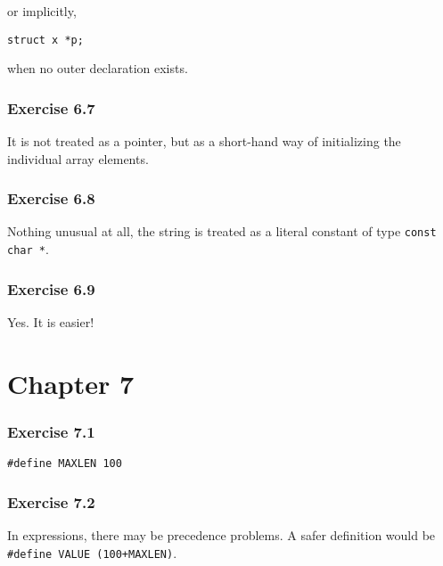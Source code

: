   or implicitly,


   \begin{Verbatim}
struct x *p;
\end{Verbatim}

   when no outer declaration exists.


  

  \subsubsection*{Exercise 6.7}

   It is not treated as a pointer, but as a short-hand way of initializing
    the individual array elements.


  

  \subsubsection*{Exercise 6.8}

   Nothing unusual at all, the string is treated as a literal constant of
    type \texttt{const char *}.


  

  \subsubsection*{Exercise 6.9}

   Yes. It is easier!


  

 
        \section*{Chapter 7}
        

  

  \subsubsection*{Exercise 7.1}

   \begin{Verbatim}
#define MAXLEN 100
\end{Verbatim}

  

  \subsubsection*{Exercise 7.2}

   In expressions, there may be precedence problems. A safer definition
    would be \texttt{\#define VALUE (100+MAXLEN)}.


